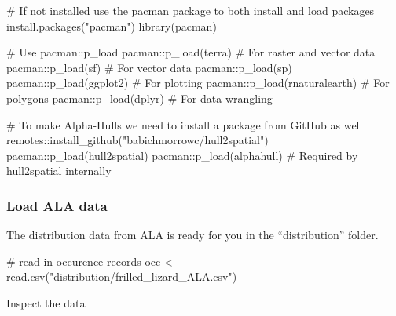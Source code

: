 \documentclass[
  letterpaper,
  DIV=11,
  numbers=noendperiod]{scrartcl}
\newenvironment{Shaded}{\begin{snugshade}}{\end{snugshade}}
\newcommand{\CommentTok}[1]{\textcolor[rgb]{0.37,0.37,0.37}{#1}}
\newcommand{\FunctionTok}[1]{\textcolor[rgb]{0.28,0.35,0.67}{#1}}
\newcommand{\NormalTok}[1]{\textcolor[rgb]{0.00,0.23,0.31}{#1}}
\newcommand{\OtherTok}[1]{\textcolor[rgb]{0.00,0.23,0.31}{#1}}
\newcommand{\SpecialCharTok}[1]{\textcolor[rgb]{0.37,0.37,0.37}{#1}}
\newcommand{\StringTok}[1]{\textcolor[rgb]{0.13,0.47,0.30}{#1}}
\begin{document}
\begin{Shaded}
\begin{Highlighting}[]
\CommentTok{\# If not installed use the pacman package to both install and load packages}
\FunctionTok{install.packages}\NormalTok{(}\StringTok{"pacman"}\NormalTok{)}
\FunctionTok{library}\NormalTok{(pacman)}

\CommentTok{\# Use pacman::p\_load }
\NormalTok{pacman}\SpecialCharTok{::}\FunctionTok{p\_load}\NormalTok{(terra)  }\CommentTok{\# For raster and vector data}
\NormalTok{pacman}\SpecialCharTok{::}\FunctionTok{p\_load}\NormalTok{(sf)  }\CommentTok{\# For vector data}
\NormalTok{pacman}\SpecialCharTok{::}\FunctionTok{p\_load}\NormalTok{(sp) }
\NormalTok{pacman}\SpecialCharTok{::}\FunctionTok{p\_load}\NormalTok{(ggplot2)  }\CommentTok{\# For plotting}
\NormalTok{pacman}\SpecialCharTok{::}\FunctionTok{p\_load}\NormalTok{(rnaturalearth) }\CommentTok{\# For polygons}
\NormalTok{pacman}\SpecialCharTok{::}\FunctionTok{p\_load}\NormalTok{(dplyr) }\CommentTok{\# For data wrangling}

\CommentTok{\# To make Alpha{-}Hulls we need to install a package from GitHub as well}
\NormalTok{remotes}\SpecialCharTok{::}\FunctionTok{install\_github}\NormalTok{(}\StringTok{"babichmorrowc/hull2spatial"}\NormalTok{)}
\NormalTok{pacman}\SpecialCharTok{::}\FunctionTok{p\_load}\NormalTok{(hull2spatial)}
\NormalTok{pacman}\SpecialCharTok{::}\FunctionTok{p\_load}\NormalTok{(alphahull)  }\CommentTok{\# Required by hull2spatial internally}
\end{Highlighting}
\end{Shaded}

\subsubsection{Load ALA data}\label{load-ala-data}

The distribution data from ALA is ready for you in the ``distribution''
folder.

\begin{Shaded}
\begin{Highlighting}[]
\CommentTok{\# read in occurence records}
\NormalTok{occ }\OtherTok{\textless{}{-}} \FunctionTok{read.csv}\NormalTok{(}\StringTok{"distribution/frilled\_lizard\_ALA.csv"}\NormalTok{)}
\end{Highlighting}
\end{Shaded}

Inspect the data

\begin{Shaded}
\end{Shaded}
\end{document}
